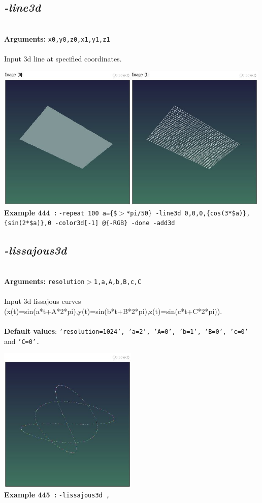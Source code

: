 \documentclass[a4paper,11pt,twoside]{book}
\begin{document}
\subsection{\emph{-line3d} }\vspace*{-0.5em}
~\\\textbf{Arguments: } 
{\small \texttt{x0,y0,z0,x1,y1,z1}}\\~\\
Input 3d line at specified coordinates.
\begin{center}\includegraphics[keepaspectratio=true,height=7cm,width=\textwidth]{img/gmic_def444.jpg}\\
{\footnotesize \textbf{Example 444~:} \texttt{-repeat 100 a=\{\$$>$*pi/50\} -line3d 0,0,0,\{cos(3*\$a)\},\{sin(2*\$a)\},0 -color3d[-1] @\{-RGB\} -done -add3d}}
\end{center}

\subsection{\emph{-lissajous3d} }\vspace*{-0.5em}
~\\\textbf{Arguments: } 
{\small \texttt{resolution$>$1,a,A,b,B,c,C}}\\~\\
Input 3d lissajous curves (x(t)=sin(a*t+A*2*pi),y(t)=sin(b*t+B*2*pi),z(t)=sin(c*t+C*2*pi)).
~\\~\\\textbf{Default values}: {\small \texttt{'resolution=1024', 'a=2', 'A=0', 'b=1', 'B=0', 'c=0'} and \texttt{'C=0'.}}
\begin{center}\includegraphics[keepaspectratio=true,height=7cm,width=\textwidth]{img/gmic_def445.jpg}\\
{\footnotesize \textbf{Example 445~:} \texttt{-lissajous3d ,}}
\end{center}
\end{document}
